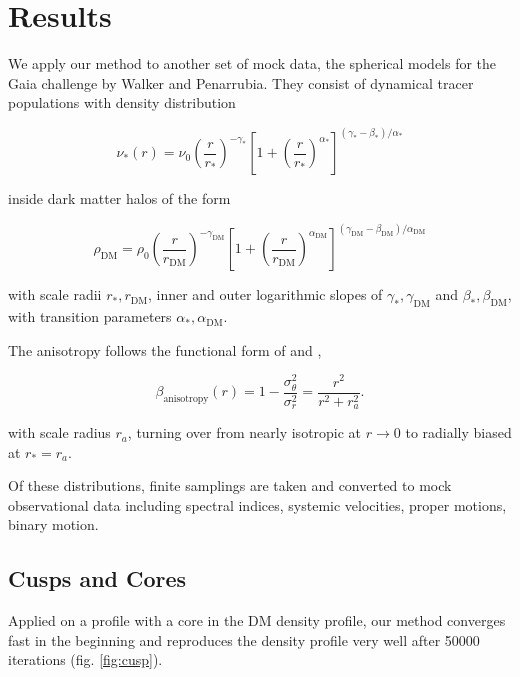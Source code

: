 \section{Results}\label{sec:results}

We apply our method to another set of mock data, the spherical models
for the Gaia challenge by Walker and Penarrubia. They consist of
dynamical tracer populations with density distribution

\begin{equation}
\nu_*(r) = \nu_0\left(\frac{r}{r_*}\right)^{-\gamma_*} \left[1+\left(\frac{r}{r_*}\right)^{\alpha_*}\right]^{(\gamma_*-\beta_*)/\alpha_*}
\end{equation}

inside dark matter halos of the form

\begin{equation}
\rho_{\text{DM}} = \rho_0\left(\frac{r}{r_{\text{DM}}}\right)^{-\gamma_{\text{DM}}}\left[1+\left(\frac{r}{r_{\text{DM}}}\right)^{\alpha_{\text{DM}}}\right]^{(\gamma_{\text{DM}}-\beta_{\text{DM}})/\alpha_{\text{DM}}}
\end{equation}

with scale radii $r_*, r_\text{DM}$, inner and outer logarithmic
slopes of $\gamma_*, \gamma_{\text{DM}}$ and
$\beta_*,\beta_{\text{DM}}$, with transition parameters $\alpha_*,
\alpha_{\text{DM}}$.

The anisotropy follows the functional form of \citet{Osipkov1979} and
\citet{Merritt1985},

\begin{equation}
\beta_{\text{anisotropy}}(r)=1-\frac{\sigma_\theta^2}{\sigma_r^2} = \frac{r^2}{r^2+r_a^2}.
\end{equation}

with scale radius $r_a$, turning over from nearly isotropic at $r\to
0$ to radially biased at $r_*=r_a$.

Of these distributions, finite samplings are taken and converted to
mock observational data including spectral indices, systemic
velocities, proper motions, binary motion.


\subsection{Cusps and Cores}

Applied on a profile with a core in the DM density profile, our method
converges fast in the beginning and reproduces the density profile very well after 50000 iterations (fig. \ref{fig:cusp}).

